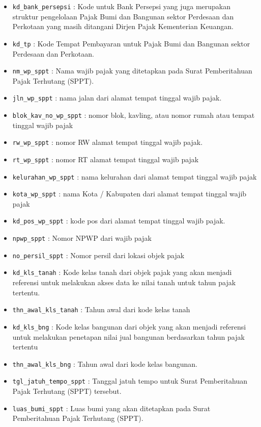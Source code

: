 \begin{itemize}
	\item \texttt{kd\_bank\_persepsi} : Kode untuk Bank Persepsi yang juga merupakan struktur pengelolaan Pajak Bumi dan Bangunan sektor Perdesaan dan Perkotaan yang masih ditangani Dirjen Pajak Kementerian Keuangan.
	\item \texttt{kd\_tp} : Kode Tempat Pembayaran untuk Pajak Bumi dan Bangunan sektor Perdesaan dan Perkotaan.
	\item \texttt{nm\_wp\_sppt} : Nama wajib pajak yang ditetapkan pada Surat Pemberitahuan Pajak Terhutang (SPPT).
	\item \texttt{jln\_wp\_sppt} : nama jalan dari alamat tempat tinggal wajib pajak.
	\item \texttt{blok\_kav\_no\_wp\_sppt} : nomor blok, kavling, atau nomor rumah atau tempat tinggal wajib pajak
	\item \texttt{rw\_wp\_sppt} : nomor RW alamat tempat tinggal wajib pajak.
	\item \texttt{rt\_wp\_sppt} : nomor RT alamat tempat tinggal wajib pajak
	\item \texttt{kelurahan\_wp\_sppt} : nama kelurahan dari alamat tempat tinggal wajib pajak
	\item \texttt{kota\_wp\_sppt} : nama Kota / Kabupaten dari alamat tempat tinggal wajib pajak
	\item \texttt{kd\_pos\_wp\_sppt} : kode pos dari alamat tempat tinggal wajib pajak.
	\item \texttt{npwp\_sppt} : Nomor NPWP dari wajib pajak
	\item \texttt{no\_persil\_sppt} : Nomor persil dari lokasi objek pajak
	\item \texttt{kd\_kls\_tanah} : Kode kelas tanah dari objek pajak yang akan menjadi referensi untuk melakukan akses data ke nilai tanah untuk tahun pajak tertentu.
	\item \texttt{thn\_awal\_kls\_tanah} : Tahun awal dari kode kelas tanah
	\item \texttt{kd\_kls\_bng} : Kode kelas bangunan dari objek yang akan menjadi referensi untuk melakukan penetapan nilai jual bangunan berdasarkan tahun pajak tertentu
	\item \texttt{thn\_awal\_kls\_bng} : Tahun awal dari kode kelas bangunan.
	\item \texttt{tgl\_jatuh\_tempo\_sppt} : Tanggal jatuh tempo untuk Surat Pemberitahuan Pajak Terhutang (SPPT) tersebut.
	\item \texttt{luas\_bumi\_sppt} : Luas bumi yang akan ditetapkan pada Surat Pemberitahuan Pajak Terhutang (SPPT).

\end{itemize}
